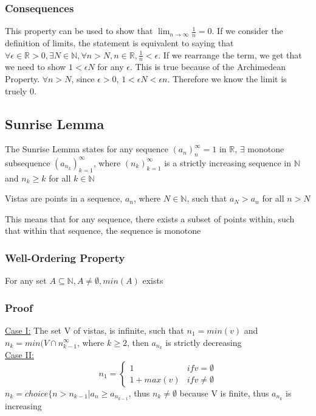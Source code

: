 \documentclass[11 pt, twoside]{article}
\begin{document}
\subsubsection{Consequences}
This property can be used to show that $\lim_{n\to\infty} \frac{1}{n} = 0$.
If we consider the definition of limits, the statement is equivalent to saying
that $\forall \epsilon \in \mathbb{R} > 0, \exists N \in \mathbb{N},
\forall n > N, n \in \mathbb{R}, \frac{1}{n} < \epsilon$.
If we rearrange the term, we get that we need to show $1 < \epsilon N$ for any
$\epsilon$. This is true because of the Archimedean Property. $\forall n > N$,
since $\epsilon > 0$, $1 < \epsilon N < \epsilon n$. Therefore we know the limit
is truely 0.

\subsection{Sunrise Lemma}

The Sunrise Lemma states for any sequence $(a_n)^\infty_n=1$ in $\mathbb{R}$, $\exists$ monotone subsequence $(a_{n_k})^\infty_{k=1}$, where $(n_k)^\infty_{k=1}$ is a strictly increasing sequence in $\mathbb{N}$ and $n_k \geq k$ for all $k \in \mathbb{N}$

Vistas are points in a sequence, $a_n$, where  $N \in \mathbb{N}$, such that $a_N > a_n$ for all $n > N$

This means that for any sequence, there exists a subset of points within, such that within that sequence, the sequence is monotone

\subsubsection{Well-Ordering Property}
For any set $A \subseteq \mathbb{N}, A \neq \emptyset, min(A)$ exists

\subsubsection{Proof}
\underline{Case I:} The set V of vistas, is infinite, such that $n_1 = min(v)$ and $n_k = min(V \cap n_{k-1}^\infty$, where $k \geq 2$, then $a_{n_k}$ is strictly decreasing\\
\underline{Case II:}
\[ n_1 =
\begin{cases}
1 & if v = \emptyset \\
1 + max(v) & if v \neq \emptyset
\end{cases} \]
$n_k = choice\{n > n_{k-1} | a_n \geq a_{n_{k-1}}$, thus $n_k \neq \emptyset$ because V is finite, thus $a_{n_k}$ is increasing
\end{document}
